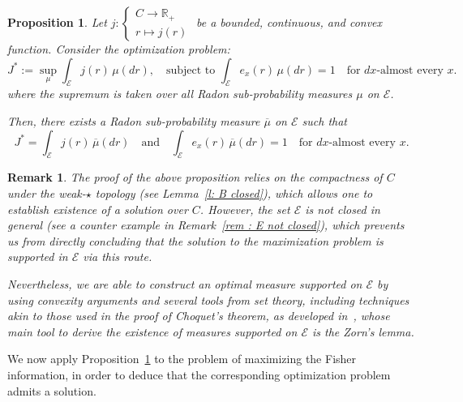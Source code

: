 \documentclass[a4paper, 11pt]{article}
\newtheorem{prop}{Proposition}
\newtheorem{rem}{Remark}
\theoremstyle{definition}
\newcommand{\R}{{\mathbb{R}}}
\newcommand{\cE}{{\mathcal{E}}}
\newcommand{\theconvex}{C}
\begin{document}
{\begin{prop} \label{prop : maximisation pb convex}
Let $j : \begin{cases} \theconvex \to \R_+ \\ r \mapsto j(r) \end{cases}$ be a bounded, continuous, and convex function. Consider the optimization problem:
\begin{equation} \label{eq : optimisation pb ctn J}
	J^* := \sup_{\mu} \int_\cE j(r) \, \mu(dr), \quad
	\text{subject to } \int_\cE e_x(r) \, \mu(dr) = 1 \quad \text{for $dx$-almost every } x.
\end{equation}
where the supremum is taken over all Radon sub-probability measures $\mu$ on $\cE$.

Then, there exists a Radon sub-probability measure $\overline{\mu}$ on $\cE$ such that
\[
	J^* = \int_\cE j(r) \, \overline{\mu}(dr)
	\quad \text{and} \quad
	\int_\cE e_x(r) \, \overline{\mu}(dr) = 1 \quad \text{for $dx$-almost every } x.
\]
\end{prop}

\begin{rem}{\label{rk: E not closed}}
The proof of the above proposition relies on the compactness of $\theconvex$ under the weak-$\star$ topology (see Lemma~\ref{l: B closed}), which allows one to establish existence of a solution over $\theconvex$. However, the set $\mathcal{E}$ is not closed in general (see a counter example in Remark~\ref{rem : E not closed}), which prevents us from directly concluding that the solution to the maximization problem is supported in $\mathcal{E}$ via this route.

Nevertheless, we are able to construct an optimal measure supported on $\mathcal{E}$ by using convexity arguments and several tools from set theory, including techniques akin to those used in the proof of Choquet’s theorem, as developed in~\cite{Choquet}, whose main tool to derive the existence of measures supported on $\cE$ is the 
Zorn's lemma.
\end{rem}

We now apply Proposition~\ref{prop : maximisation pb convex} to the problem of maximizing the Fisher information, in order to deduce that the corresponding optimization problem admits a solution. 

}
\end{document}
